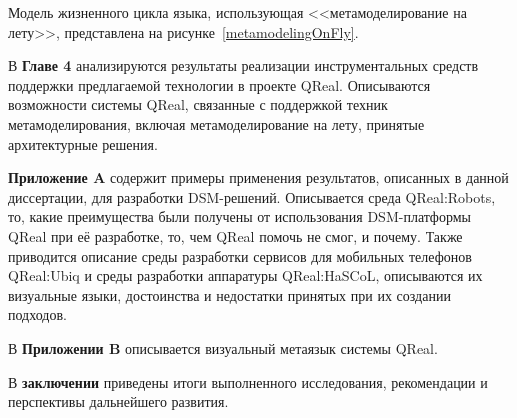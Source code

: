 Модель жизненного цикла языка, использующая <<метамоделирование на лету>>, представлена 
на рисунке~\ref{metamodelingOnFly}.

В \textbf{Главе 4} анализируются результаты реализации инструментальных средств поддержки предлагаемой 
технологии в проекте QReal. Описываются возможности системы QReal, связанные с поддержкой 
техник метамоделирования, включая метамоделирование на лету, принятые архитектурные 
решения.

\textbf{Приложение A} содержит примеры применения результатов, описанных в данной 
диссертации, для разработки DSM-решений. Описывается среда QReal:Robots, то, какие 
преимущества были получены от использования DSM-платформы QReal при её разработке, 
то, чем QReal помочь не смог, и почему. Также приводится описание среды разработки 
сервисов для мобильных телефонов QReal:Ubiq и среды разработки аппаратуры QReal:HaSCoL, 
описываются их визуальные языки, достоинства и недостатки принятых при их создании подходов.

В \textbf{Приложении B} описывается визуальный метаязык системы QReal.

В \textbf{заключении} приведены итоги выполненного исследования, рекомендации и перспективы дальнейшего развития.

